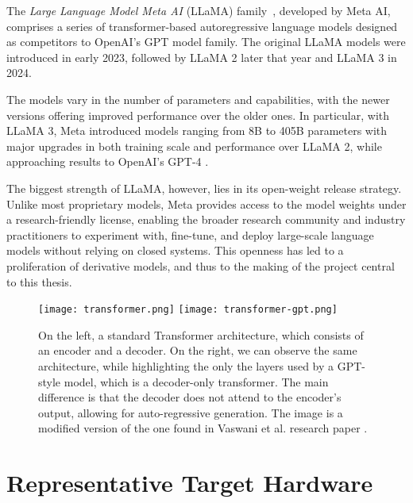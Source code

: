 The \textit{Large Language Model Meta AI} (LLaMA) family~\cite{llama}, developed by Meta AI, comprises a series of transformer-based autoregressive language models designed as competitors to OpenAI's GPT model family. The original LLaMA models were introduced in early 2023, followed by LLaMA 2 \cite{llama2} later that year and LLaMA 3 \cite{llama3} in 2024.

The models vary in the number of parameters and capabilities, with the newer versions offering improved performance over the older ones. In particular, with LLaMA 3, Meta introduced models ranging from 8B to 405B parameters with major upgrades in both training scale and performance over LLaMA 2, while approaching results to OpenAI's GPT-4 \cite{gpt4} \cite{llama3}.

The biggest strength of LLaMA, however, lies in its open-weight release strategy. Unlike most proprietary models, Meta provides access to the model weights under a research-friendly license, enabling the broader research community and industry practitioners to experiment with, fine-tune, and deploy large-scale language models without relying on closed systems. This openness has led to a proliferation of derivative models, and thus to the making of the project central to this thesis.


\begin{figure}[htbp]
    \centering
    \texttt{[image: transformer.png]}
    \hfill
    \texttt{[image: transformer-gpt.png]}
    \caption[Comparison of Transformer Architectures]{On the left, a standard Transformer architecture, which consists of an encoder and a decoder. On the right, we can observe the same architecture, while highlighting the only the layers used by a GPT-style model, which is a decoder-only transformer. The main difference is that the decoder does not attend to the encoder's output, allowing for auto-regressive generation. The image is a modified version of the one found in Vaswani et al. research paper \cite{attention_is_all_you_need}.}
    \label{fig:sidebyside}
\end{figure}

\section{Representative Target Hardware} \label{target_hardware}

